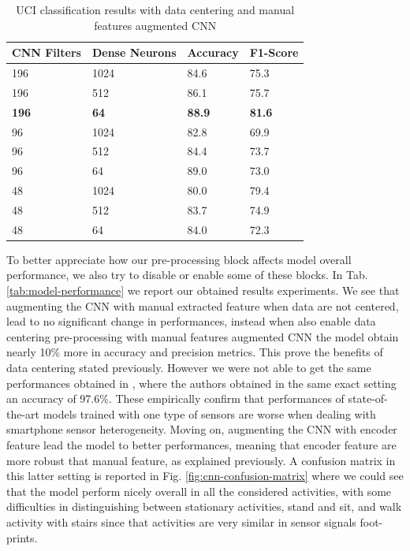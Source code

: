 \begin{table}[h]
	\begin{center}
		\begin{tabular}{ p{1.8cm}p{1.7cm}p{1.7cm}p{1.7cm} }
			\hline
			CNN Filters & Dense Neurons & Accuracy & F1-Score \\
			\hline
			196 & 1024 & 84.6 & 75.3 \\
			196 & 512 & 86.1 & 75.7 \\
			\textbf{196} & \textbf{64} & \textbf{88.9} & \textbf{81.6} \\
			96 & 1024 & 82.8 & 69.9 \\
			96 & 512 & 84.4 & 73.7 \\
			96 & 64 & 89.0 & 73.0 \\
			48 & 1024 & 80.0 & 79.4 \\
			48 & 512 & 83.7 & 74.9 \\
			48 & 64 & 84.0 & 72.3 \\
			\hline
		\end{tabular}
		\caption{\label{tab:model-selection} UCI classification results with data centering and manual features augmented CNN}
	\end{center}
\end{table}


To better appreciate how our pre-processing block affects model overall performance, we also try to disable or enable some of these blocks. In Tab. \ref{tab:model-performance} we report our obtained results experiments. We see that augmenting the CNN with manual extracted feature when data are not centered, lead to no significant change in performances, instead when also enable data centering pre-processing with manual features augmented CNN the model obtain nearly 10\% more in accuracy and precision metrics. This prove the benefits of data centering stated previously. However we were not able to get the same performances obtained in \cite{ignatov2018real}, where the authors obtained in the same exact setting an accuracy of 97.6\%. These empirically confirm that performances of state-of-the-art models trained with one type of sensors are worse when dealing with smartphone sensor heterogeneity. Moving on, augmenting the CNN with encoder feature lead the model to better performances, meaning that encoder feature are more robust that manual feature, as explained previously. A confusion matrix in this latter setting is reported in Fig. \ref{fig:cnn-confusion-matrix} where we could see that the model perform nicely overall in all the considered activities, with some difficulties in distinguishing between stationary activities, stand and sit, and walk activity with stairs since that activities are very similar in sensor signals foot-prints.

